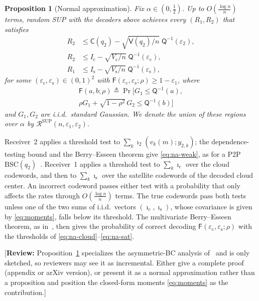\documentclass[conference]{IEEEtran}
\newtheorem{proposition}{Proposition}
\newcommand{\Qinv}{\mathsf{Q}^{-1}}
\newcommand{\Vsf}{\mathsf{V}}
\newcommand{\Csf}{\mathsf{C}}
\newcommand{\Rs}{\mathcal{R}}
\newcommand{\BSC}{\mathrm{BSC}}
\newcommand{\reviewnote}[1]{{\color{red}\footnotesize[\textbf{Review:} #1]}}
\begin{document}
\begin{proposition}[Normal approximation]
\label{prop:na}
Fix $\alpha\in(0,\frac12)$. Up to $O(\frac{\log n}{n})$ terms, random SUP with the decoders above achieves every $(R_1,R_2)$ that satisfies
\begin{subequations}
\label{eq:na}
\begin{align}
R_2&\leq\Csf(q_2)-\sqrt{\Vsf(q_2)/n}\;\Qinv(\varepsilon_2),\label{eq:na-weak}\\
R_2&\leq I_{\mathrm c}-\sqrt{V_{\mathrm c}/n}\;\Qinv(\varepsilon_{\mathrm c}),\label{eq:na-cloud}\\
R_1&\leq I_{\mathrm s}-\sqrt{V_{\mathrm s}/n}\;\Qinv(\varepsilon_{\mathrm s}),\label{eq:na-sat}
\end{align}
\end{subequations}
for some $(\varepsilon_{\mathrm c},\varepsilon_{\mathrm s})\in(0,1)^2$ with $\mathsf{F}(\varepsilon_{\mathrm c},\varepsilon_{\mathrm s};\rho)\geq1-\varepsilon_1$, where
\begin{multline*}
\mathsf{F}(a,b;\rho)\triangleq\Pr\big[G_1\leq\Qinv(a),\\ \rho G_1+\sqrt{1-\rho^2}\,G_2\leq\Qinv(b)\big]
\end{multline*}
and $G_1,G_2$ are i.i.d.\ standard Gaussian. We denote the union of these regions over $\alpha$ by $\Rs^{\mathrm{SUP}}(n,\varepsilon_1,\varepsilon_2)$.
\end{proposition}
\begin{IEEEproof}
Receiver~2 applies a threshold test to $\sum_k\imath_2(v_k(m);y_{2,k})$; the dependence-testing bound and the Berry--Esseen theorem give \eqref{eq:na-weak}, as for a P2P $\BSC(q_2)$~\cite{polyanskiy:TIT2010}. Receiver~1 applies a threshold test to $\sum_k\imath_{\mathrm c}$ over the cloud codewords, and then to $\sum_k\imath_{\mathrm s}$ over the satellite codewords of the decoded cloud center. An incorrect codeword passes either test with a probability that only affects the rates through $O(\frac{\log n}{n})$ terms. The true codewords pass both tests unless one of the two sums of i.i.d.\ vectors $(\imath_{\mathrm c},\imath_{\mathrm s})$, whose covariance is given by \eqref{eq:moments}, falls below its threshold. The multivariate Berry--Esseen theorem, as in~\cite{Tan+Kosut}, then gives the probability of correct decoding $\mathsf{F}(\varepsilon_{\mathrm c},\varepsilon_{\mathrm s};\rho)$ with the thresholds of \eqref{eq:na-cloud}--\eqref{eq:na-sat}.
\end{IEEEproof}
\reviewnote{Proposition~\ref{prop:na} specializes the asymmetric-BC analysis of~\cite{Tan+Kosut} and is only sketched, so reviewers may see it as incremental. Either give a complete proof (appendix or arXiv version), or present it as a normal approximation rather than a proposition and position the closed-form moments \eqref{eq:moments} as the contribution.}
\end{document}
